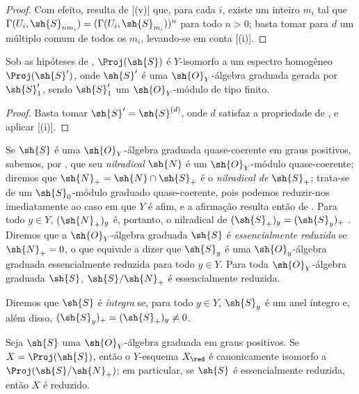 \documentclass[oneside,10pt]{amsart}
\newcommand{\oldpage}[2][]{\marginnote{\normalfont\footnotesize\textbf{#1}~|~#2}\ignorespaces}
\let\EGAOriginalLabel\label
\renewcommand{\label}[1]{\phantomsection\EGAOriginalLabel{#1}}
\begin{document}
\begin{proof}
Com efeito, resulta de [(v)] que, para cada $i$, existe um inteiro $m_i$ tal que $\Gamma(U_i,\sh{S}_{nm_i})=(\Gamma(U_i,\sh{S}_{m_i}))^n$ para todo $n>0$;
basta tomar para $d$ um múltiplo comum de todos os $m_i$, levando-se em conta [(i)].
\end{proof}

\begin{corollary}[3.1.11]
\label{II.3.1.11}
Sob as hipóteses de , $\Proj(\sh{S})$ é $Y$-isomorfo a um espectro homogêneo $\Proj(\sh{S}')$, onde $\sh{S}'$ é uma $\sh{O}_Y$-álgebra graduada gerada por $\sh{S}'_1$, sendo $\sh{S}'_1$ um $\sh{O}_Y$-módulo de tipo finito.
\end{corollary}

\begin{proof}
Basta tomar $\sh{S}'=\sh{S}^{(d)}$, onde $d$ satisfaz a propriedade de , e aplicar [(i)].
\end{proof}

\begin{env}[3.1.12]
\label{II.3.1.12}
Se $\sh{S}$ é uma $\sh{O}_Y$-álgebra graduada quase-coerente em graus positivos, sabemos, por , que seu \emph{nilradical} $\sh{N}$ é um $\sh{O}_Y$-módulo quase-coerente;
diremos que $\sh{N}_+=\sh{N}\cap\sh{S}_+$ é o \emph{nilradical de $\sh{S}_+$};
trata-se de um $\sh{S}_0$-módulo graduado quase-coerente, pois podemos reduzir-nos imediatamente ao caso em que $Y$ é afim, e a afirmação resulta então de .
Para todo $y\in Y$, $(\sh{N}_+)_y$ é, portanto, o nilradical de $(\sh{S}_+)_y=(\sh{S}_y)_+$ .
Diremos que a $\sh{O}_Y$-álgebra graduada $\sh{S}$ é \emph{essencialmente reduzida} se $\sh{N}_+=0$, o que equivale
\oldpage[II]{53}
a dizer que $\sh{S}_y$ é uma $\sh{O}_y$-álgebra graduada essencialmente reduzida para todo $y\in Y$.
Para toda $\sh{O}_Y$-álgebra graduada $\sh{S}$, $\sh{S}/\sh{N}_+$ é essencialmente reduzida.

Diremos que $\sh{S}$ é \emph{íntegra} se, para todo $y\in Y$, $\sh{S}_y$ é um anel íntegro e, além disso, $(\sh{S}_y)_+=(\sh{S}_+)_y\neq0$.
\end{env}

\begin{proposition}[3.1.13]
\label{II.3.1.13}
Seja $\sh{S}$ uma $\sh{O}_Y$-álgebra graduada em graus positivos.
Se $X=\Proj(\sh{S})$, então o $Y$-esquema $X_\red$ é canonicamente isomorfo a $\Proj(\sh{S}/\sh{N}_+)$;
em particular, se $\sh{S}$ é essencialmente reduzida, então $X$ é reduzido.
\end{proposition}
\end{document}
